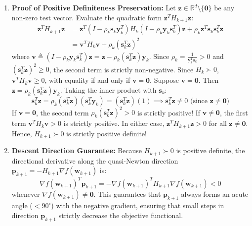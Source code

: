 \begin{enumerate}[label=(\alph*)]
    \item \textbf{Proof of Positive Definiteness Preservation:}
    Let $\mathbf{z} \in \mathbb{R}^d \setminus \{\mathbf{0}\}$ be any non-zero test vector. Evaluate the quadratic form $\mathbf{z}^T H_{k+1} \mathbf{z}$:
    \begin{align*}
    \mathbf{z}^T H_{k+1} \mathbf{z} &= \mathbf{z}^T \left( I - \rho_k \mathbf{s}_k \mathbf{y}_k^T \right) H_k \left( I - \rho_k \mathbf{y}_k \mathbf{s}_k^T \right) \mathbf{z} + \rho_k \mathbf{z}^T \mathbf{s}_k \mathbf{s}_k^T \mathbf{z} \\
    &= \mathbf{v}^T H_k \mathbf{v} + \rho_k (\mathbf{s}_k^T \mathbf{z})^2
    \end{align*}
    where $\mathbf{v} \triangleq \left( I - \rho_k \mathbf{y}_k \mathbf{s}_k^T \right) \mathbf{z} = \mathbf{z} - \rho_k (\mathbf{s}_k^T \mathbf{z}) \mathbf{y}_k$.
    Since $\rho_k = \frac{1}{\mathbf{y}_k^T \mathbf{s}_k} > 0$ and $(\mathbf{s}_k^T \mathbf{z})^2 \ge 0$, the second term is strictly non-negative.
    Since $H_k \succ 0$, $\mathbf{v}^T H_k \mathbf{v} \ge 0$, with equality if and only if $\mathbf{v} = \mathbf{0}$.
    Suppose $\mathbf{v} = \mathbf{0}$. Then $\mathbf{z} = \rho_k (\mathbf{s}_k^T \mathbf{z}) \mathbf{y}_k$. Taking the inner product with $\mathbf{s}_k$:
    \begin{equation*}
    \mathbf{s}_k^T \mathbf{z} = \rho_k (\mathbf{s}_k^T \mathbf{z}) (\mathbf{s}_k^T \mathbf{y}_k) = (\mathbf{s}_k^T \mathbf{z}) (1) \implies \mathbf{s}_k^T \mathbf{z} \ne 0 \text{ (since } \mathbf{z} \ne \mathbf{0})
    \end{equation*}
    If $\mathbf{v} = \mathbf{0}$, the second term $\rho_k (\mathbf{s}_k^T \mathbf{z})^2 > 0$ is strictly positive!
    If $\mathbf{v} \ne \mathbf{0}$, the first term $\mathbf{v}^T H_k \mathbf{v} > 0$ is strictly positive.
    In either case, $\mathbf{z}^T H_{k+1} \mathbf{z} > 0$ for all $\mathbf{z} \ne \mathbf{0}$.
    Hence, $H_{k+1} \succ 0$ is strictly positive definite!

    \item \textbf{Descent Direction Guarantee:}
    Because $H_{k+1} \succ 0$ is positive definite, the directional derivative along the quasi-Newton direction $\mathbf{p}_{k+1} = -H_{k+1}\nabla f(\mathbf{w}_{k+1})$ is:
    \begin{equation*}
    \nabla f(\mathbf{w}_{k+1})^T \mathbf{p}_{k+1} = -\nabla f(\mathbf{w}_{k+1})^T H_{k+1} \nabla f(\mathbf{w}_{k+1}) < 0
    \end{equation*}
    whenever $\nabla f(\mathbf{w}_{k+1}) \ne \mathbf{0}$.
    This guarantees that $\mathbf{p}_{k+1}$ always forms an acute angle ($< 90^\circ$) with the negative gradient, ensuring that small steps in direction $\mathbf{p}_{k+1}$ strictly decrease the objective functional.
\end{enumerate}

